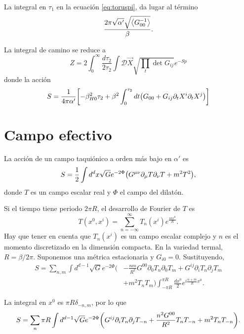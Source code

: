 La integral en $\tau_1$ en la ecuación \ref{eq:toruspi}, da lugar al término 
\begin{equation}
  \frac{2\pi\sqrt{\alpha'}\sqrt{\ev{G_{00}^{-1}}}}{\beta}.
\end{equation}

La integral de camino se reduce a 
\begin{equation}
  Z=2\int_0^\infty \frac{d\tau_2}{2\tau_2}\int \mathcal D \vec {X} \sqrt{\prod_t \det G_{ij}}e^{-Sp}
\end{equation}
donde la acción 
\begin{equation}
  S=\frac{1}{4\pi\alpha'}\qty[-\beta^2_{H0}\tau_2+\beta^2 \int_0^{\tau_2}dt \qty(G_{00}+G_{ij}\partial_t X^i\partial_t X^j)]
\end{equation}


\section{Campo efectivo}

La acción de un campo taquiónico a orden más bajo en $\alpha'$ es
\begin{equation}
  S=\frac{1}{2}\int d^d x\sqrt G e^{-2\Phi}  \qty(G^{\mu\nu}\partial_\mu T\partial_\nu T+m^2T^2),
\end{equation}
donde $T$ es un campo escalar real y $\Phi$ el campo del dilatón.

Si el tiempo tiene periodo $2\pi R$, el desarrollo de Fourier de $T$ es
\begin{equation}
  T(x^0,x^i)=\sum_{n=-\infty}^{\infty} T_n(x^i)e^{\frac{inx^0}{R}}.
\end{equation}
Hay que tener en cuenta que $T_n(x^i)$ es un campo escalar complejo
y $n$ es el momento discretizado en la dimensión compacta.
En la variedad termal, $R=\beta/2\pi$. 
Suponemos una métrica estacionaria y $G_{i0}=0$.
Sustituyendo,
\begin{equation}
  \begin{aligned}
    S=\sum_{n,m} \int d^{d-1} \sqrt{G}e^{-2\Phi}\biggl(&-\frac{nm}{R^2}G^{00}\partial_0 T_n \partial_0 T_{m} 
    + G^{ij}\partial_i T_n \partial_j T_{m} \\
    &+ m^2 T_n T_{m}\biggl) \int_{-\pi R}^{\pi R} \frac{dx^0}{2}e^{i\frac{n+m}{R}x^0}.
  \end{aligned}
\end{equation}

La integral en $x^0$ es $\pi R \delta_{-n,m}$, por lo que
\begin{equation}
  S=\sum_n\pi R \int d^{d-1} \sqrt{G}e^{-2\Phi}\qty(G^{ij}\partial_i T_n \partial_j T_{-n} + \frac{n^2 G^{00}}{R^2}T_n T_{-n} + m^2 T_n T_{-n}).
\end{equation}

